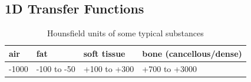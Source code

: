\documentclass{egpubl}
\begin{document}
\subsection{1D Transfer Functions}

\begin{table}
	\centering
	\normalsize
	\begin{tabular}{llll}
		\hline
		air & fat & soft tissue & bone (cancellous/dense)\\
		\hline
		-1000 & -100 to -50 & +100 to +300 & +700 to +3000\\
		\hline
	\end{tabular}
	\caption{Hounsfield units of some typical substances \cite{feeman_mathematics_2009}}
	\label{table:Hounsfield_unit}
\end{table}
\end{document}
